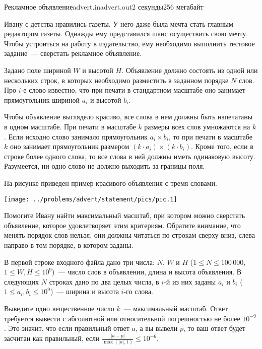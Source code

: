 \begin{problem}{Рекламное объявление}{advert.in}{advert.out}{2 секунды}{256 мегабайт}


Ивану с детства нравились газеты. У него даже была мечта стать главным редактором газеты. 
Однажды ему представился шанс осуществить свою мечту. 
Чтобы устроиться на работу в издательство, ему необходимо выполнить тестовое задание~--- сверстать рекламное объявление. 

Задано поле шириной $W$ и высотой $H$.
Объявление должно состоять из одной или нескольких строк,
в которых необходимо разместить в заданном порядке $N$ слов. 
Про $i$-е слово известно, что при печати в стандартном масштабе оно занимает прямоугольник
шириной $a_i$ и высотой $b_i$.

Чтобы объявление выглядело красиво, все слова в нем должны быть напечатаны в одном масштабе. 
При печати в масштабе 
$k$ размеры всех слов умножаются на $k$. 
Если исходно слово занимало прямоугольник $a_i \times b_i$, то при печати в масштабе
$k$ оно занимает прямоугольник размером $(k \cdot a_i)\times(k \cdot b_i)$.
Кроме того, если в строке более одного слова, то все слова в ней должны иметь 
одинаковую высоту. Разумеется, ни одно слово не должно выходить за границы поля.

На рисунке приведен пример красивого объявления с тремя словами.

\begin{center}
	\texttt{[image: ../problems/advert/statement/pics/pic.1]}
\end{center}

Помогите Ивану найти максимальный масштаб, при котором можно сверстать объявление, 
которое удовлетворяет этим критериям. Обратите внимание, что
менять порядок слов нельзя, они должны читаться по строкам
сверху вниз, слева направо в том порядке, в котором заданы.

\InputFile
В первой строке входного файла дано три числа: $N$, $W$ и $H$ ($1 \le N \le 100\,000$, $1 \le W, H \le 10^9$)~---
число слов в объявлении, длина и высота объявления.           
В следующих $N$ строках дано по два целых числа, в $i$-й из
них заданы $a_i$ и $b_i$ ($1 \le a_i, b_i \le 10^9$)~--- ширина и высота $i$-го слова.          

\OutputFile
Выведите одно вещественное число $k$~--- максимальный масштаб. Ответ требуется вывести с абсолютной или относительной
погрешностью не более $10^{-9}$. Это значит, что если правильный ответ $a$, а вы вывели $p$, то
ваш ответ будет засчитан как правильный, если $\frac{|a-p|}{\max(|a|, 1)} \le 10^{-6}$.

\Examples

\begin{example}%
%
%       
\end{example}


\end{problem}
